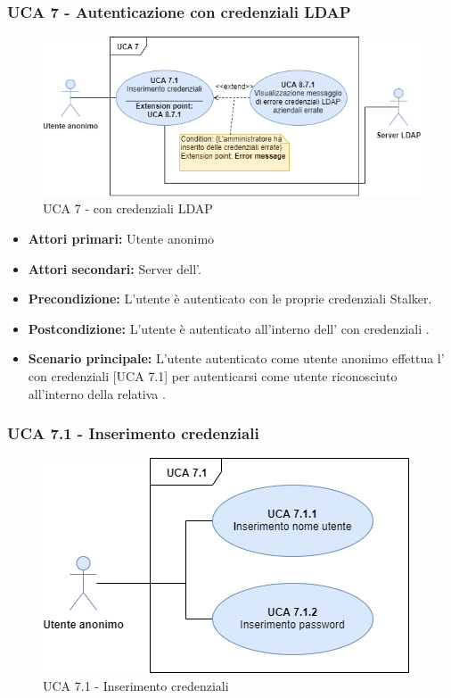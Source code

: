 


\subsubsection{UCA 7 - Autenticazione con credenziali LDAP}%

\begin{figure}[h]
	\centering
	\includegraphics[scale=0.4, center]{Sezioni/UseCase/Immagini/UCA7.png}
	\caption{UCA 7 -  con credenziali LDAP}
\end{figure}

\begin{itemize}
	\item \textbf{Attori primari:} Utente anonimo 
	\item \textbf{Attori secondari:} Server  dell'.
	\item \textbf{Precondizione:} L'utente è autenticato con le proprie credenziali Stalker.
	\item \textbf{Postcondizione:} L'utente è autenticato all'interno dell' con credenziali .
	\item \textbf{Scenario principale:} L'utente autenticato come utente anonimo effettua l' con credenziali  [UCA 7.1] per autenticarsi come utente riconosciuto all'interno della relativa .
\end{itemize}

\subsubsection{UCA 7.1 - Inserimento credenziali}
\begin{figure}[h]
	\centering
	\includegraphics[scale=0.5, center]{Sezioni/UseCase/Immagini/UCA7.1.png}
	\caption{UCA 7.1 - Inserimento credenziali}
\end{figure}

